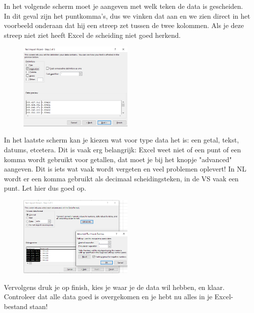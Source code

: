 In het volgende scherm moet je aangeven met welk teken de data is gescheiden. In dit geval zijn het puntkomma's, dus we vinken dat aan en we zien direct in het voorbeeld onderaan dat hij een streep zet tussen de twee kolommen. Als je deze streep niet ziet heeft Excel de scheiding niet goed herkend.

\begin{figure}[h]
\begin{center}
\includegraphics[width=0.5\textwidth]{img/Excelimport3.png}
\end{center}
\end{figure}

In het laatste scherm kan je kiezen wat voor type data het is: een getal, tekst, datums, etcetera. Dit is vaak erg belangrijk: Excel weet niet of een punt of een komma wordt gebruikt voor getallen, dat moet je bij het knopje "advanced" aangeven. Dit is iets wat vaak wordt vergeten en veel problemen oplevert! In NL wordt er een komma gebruikt als decimaal scheidingsteken, in de VS vaak een punt. Let hier dus goed op.

\begin{figure}[h]
\begin{center}
\includegraphics[width=0.5\textwidth]{img/Excelimport4.png}
\end{center}
\end{figure}

Vervolgens druk je op finish, kies je waar je de data wil hebben, en klaar. Controleer dat alle data goed is overgekomen en je hebt nu alles in je Excel-bestand staan!

